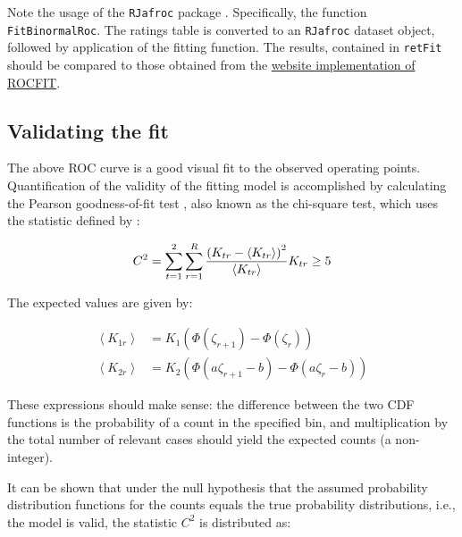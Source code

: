 \documentclass[
]{book}
\begin{document}
Note the usage of the \texttt{RJafroc} package \citep{R-RJafroc}. Specifically, the function \texttt{FitBinormalRoc}. The ratings table is converted to an \texttt{RJafroc} dataset object, followed by application of the fitting function. The results, contained in \texttt{retFit} should be compared to those obtained from the \href{http://www.rad.jhmi.edu/jeng/javarad/roc/JROCFITi.html}{website implementation of ROCFIT}.

\hypertarget{binormal-model-curve-fitting-validation}{%
\subsection{Validating the fit}\label{binormal-model-curve-fitting-validation}}

The above ROC curve is a good visual fit to the observed operating points. Quantification of the validity of the fitting model is accomplished by calculating the Pearson goodness-of-fit test \citep{RN2656}, also known as the chi-square test, which uses the statistic defined by \citep{larsen2005introduction}:

\begin{equation} 
C^2=\sum_{t=1}^{2}\sum_{r=1}^{R}\frac{\left (K_{tr}-\left \langle K_{tr} \right \rangle  \right )^2}{\left \langle K_{tr} \right \rangle}\\
K_{tr} \geq 5
\label{eq:binormal-modelGoodnessFit}
\end{equation}

The expected values are given by:

\begin{equation}
\begin{split}
\left \langle K_{1r} \right \rangle &=K_1\left ( \Phi\left ( \zeta_{r+1} \right ) - \Phi\left ( \zeta_r \right )  \right ) \\
\left \langle K_{2r} \right \rangle &=K_2\left ( \Phi\left ( a\zeta_{r+1}-b \right ) - \Phi\left ( a\zeta_r - b\right )  \right )
\end{split}
\label{eq:binormal-modelGoodnessFitExpVals}
\end{equation}

These expressions should make sense: the difference between the two CDF functions is the probability of a count in the specified bin, and multiplication by the total number of relevant cases should yield the expected counts (a non-integer).

It can be shown that under the null hypothesis that the assumed probability distribution functions for the counts equals the true probability distributions, i.e., the model is valid, the statistic \(C^2\) is distributed as:
\end{document}
